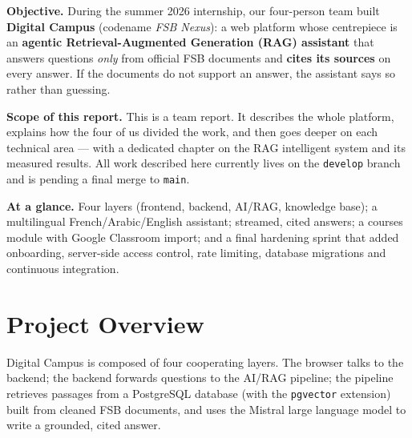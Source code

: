 \documentclass[11pt,a4paper]{article}
\begin{document}
\textbf{Objective.} During the summer 2026 internship, our four-person team built \textbf{Digital Campus} (codename \textit{FSB Nexus}): a web platform whose centrepiece is an \textbf{agentic Retrieval-Augmented Generation (RAG) assistant} that answers questions \textit{only} from official FSB documents and \textbf{cites its sources} on every answer. If the documents do not support an answer, the assistant says so rather than guessing.

\textbf{Scope of this report.} This is a team report. It describes the whole platform, explains how the four of us divided the work, and then goes deeper on each technical area --- with a dedicated chapter on the RAG intelligent system and its measured results. All work described here currently lives on the \texttt{develop} branch and is pending a final merge to \texttt{main}.

\begin{callout}
\textbf{At a glance.} Four layers (frontend, backend, AI/RAG, knowledge base); a multilingual French/Arabic/English assistant; streamed, cited answers; a courses module with Google Classroom import; and a final hardening sprint that added onboarding, server-side access control, rate limiting, database migrations and continuous integration.
\end{callout}

\section{Project Overview}
Digital Campus is composed of four cooperating layers. The browser talks to the backend; the backend forwards questions to the AI/RAG pipeline; the pipeline retrieves passages from a PostgreSQL database (with the \texttt{pgvector} extension) built from cleaned FSB documents, and uses the Mistral large language model to write a grounded, cited answer.
\end{document}
